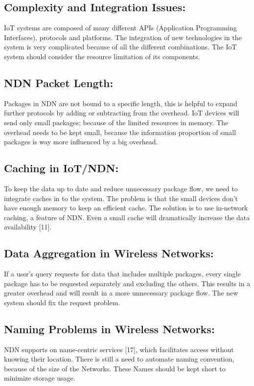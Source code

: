 \documentclass[conference]{IEEEtran}
\begin{document}

\subsection{Complexity and Integration Issues:}
IoT systems are composed of many different APIs (Application Programming Interfaces), 
protocols and platforms. 
The integration of new technologies in the system is very complicated because of all the different combinations. 
The IoT system should consider the resource limitation of its components.


\subsection{NDN Packet Length:}
Packages in NDN are not bound to a specific length, this is helpful to expand further protocols by adding or subtracting from the overhead.
IoT devices will send only small packages; because of the limited resources in memory.
The overhead needs to be kept small, because the information proportion of small packages is way more influenced by a big overhead.

\subsection{Caching in IoT/NDN:}
To keep the data up to date and reduce unnecessary package flow, we need to integrate caches in to the system. 
The problem is that the small devices don't have enough memory to keep an efficient cache. 
The solution is to use in-network caching, a feature of NDN.
Even a small cache will dramatically increase the data availability [11].
\subsection{Data Aggregation in Wireless Networks:}
If a user's query requests for data that includes multiple packages, every single package has to be requested separately and excluding the others.
This results in a greater overhead and will result in a more unnecessary package flow. The new system should fix the request problem.

\subsection{Naming Problems in Wireless Networks:}
NDN supports on name-centric services [17], which facilitates access without knowing their location. There is still a need to automate naming convention, because of the size of the Networks. These Names should be kept short to minimize storage usage. 
\end{document}
